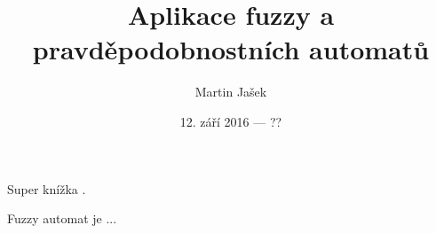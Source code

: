 \documentclass[a4paper,10pt]{article}
\title{Aplikace fuzzy a pravděpodobnostních automatů}
\author{Martin Jašek}
\date{12. září 2016 --- ??}
\begin{document}
\maketitle
\tableofcontents

\newpage

Super knížka \cite{Bel-FuzRelSyss}.

\begin{definition}
 Fuzzy automat je ...
\end{definition}


\newpage


\end{document}
